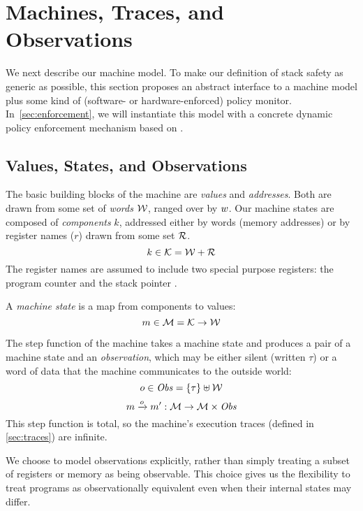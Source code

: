\documentclass[acmsmall,review,anonymous]{acmart}\settopmatter{printfolios=true,printccs=false,printacmref=false}
\begin{document}
\section{Machines, Traces, and Observations}
\label{sec:prelim}

We next describe our machine model. To make our definition of stack safety
as generic as possible, this section proposes an abstract interface to a
machine model plus some kind of 
(software- or
hardware-enforced) policy monitor. In~\cref{sec:enforcement}, we will
instantiate this model with a concrete dynamic policy enforcement mechanism
based on \citet{DBLP:conf/sp/RoesslerD18}.

\subsection{Values, States, and Observations}

The basic building blocks of the machine are {\em values} and {\em
  addresses}. Both are drawn from some set of {\em words}
${\mathcal W}$, ranged over by $w$.
%
Our machine states are composed of {\em components} $k$, addressed either by
words (memory addresses) or by register names ($r$) drawn from some set
${\mathcal R}$.
%
    \[k \in {\mathcal K} = {\mathcal W} + {\mathcal R} \]
%
The register names are assumed to include two special purpose registers: the
program counter {\PCname} and the stack pointer \SP.

A {\em machine state} is a map from components to values:
%
\[m \in {\mathcal M} = {\mathcal K} \rightarrow {\mathcal W}\]

The step function of the machine takes a machine state and produces a
pair of a machine state and an {\em observation}, which may be either
silent (written $\tau$) or a word of data that the machine
communicates to the outside world:
%
\[o \in \mathit{Obs} = \{\tau\} \uplus {\mathcal W}\]
\[m \xrightarrow{o} m' : {\mathcal M} \rightarrow {\mathcal M} \times \mathit{Obs} \]
%
This step function is total, so the machine's execution traces
(defined in \cref{sec:traces}) are infinite.

We choose to model observations explicitly, rather than simply
treating
a subset of registers or memory as being observable.  This choice gives
us the flexibility to treat programs as observationally equivalent even when
their internal states may differ.
\end{document}
